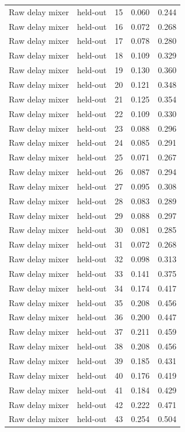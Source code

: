 \begin{tabular}{llrrr}
Raw delay mixer & held-out & 15 & 0.060 & 0.244 \\
Raw delay mixer & held-out & 16 & 0.072 & 0.268 \\
Raw delay mixer & held-out & 17 & 0.078 & 0.280 \\
Raw delay mixer & held-out & 18 & 0.109 & 0.329 \\
Raw delay mixer & held-out & 19 & 0.130 & 0.360 \\
Raw delay mixer & held-out & 20 & 0.121 & 0.348 \\
Raw delay mixer & held-out & 21 & 0.125 & 0.354 \\
Raw delay mixer & held-out & 22 & 0.109 & 0.330 \\
Raw delay mixer & held-out & 23 & 0.088 & 0.296 \\
Raw delay mixer & held-out & 24 & 0.085 & 0.291 \\
Raw delay mixer & held-out & 25 & 0.071 & 0.267 \\
Raw delay mixer & held-out & 26 & 0.087 & 0.294 \\
Raw delay mixer & held-out & 27 & 0.095 & 0.308 \\
Raw delay mixer & held-out & 28 & 0.083 & 0.289 \\
Raw delay mixer & held-out & 29 & 0.088 & 0.297 \\
Raw delay mixer & held-out & 30 & 0.081 & 0.285 \\
Raw delay mixer & held-out & 31 & 0.072 & 0.268 \\
Raw delay mixer & held-out & 32 & 0.098 & 0.313 \\
Raw delay mixer & held-out & 33 & 0.141 & 0.375 \\
Raw delay mixer & held-out & 34 & 0.174 & 0.417 \\
Raw delay mixer & held-out & 35 & 0.208 & 0.456 \\
Raw delay mixer & held-out & 36 & 0.200 & 0.447 \\
Raw delay mixer & held-out & 37 & 0.211 & 0.459 \\
Raw delay mixer & held-out & 38 & 0.208 & 0.456 \\
Raw delay mixer & held-out & 39 & 0.185 & 0.431 \\
Raw delay mixer & held-out & 40 & 0.176 & 0.419 \\
Raw delay mixer & held-out & 41 & 0.184 & 0.429 \\
Raw delay mixer & held-out & 42 & 0.222 & 0.471 \\
Raw delay mixer & held-out & 43 & 0.254 & 0.504 \\

\end{tabular}
